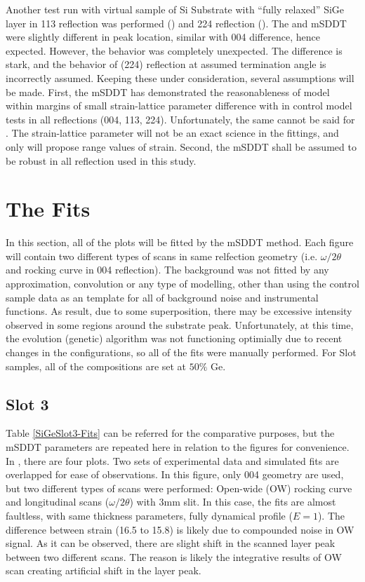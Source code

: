 Another test run with virtual sample of Si Substrate with ``fully relaxed'' SiGe layer in 113 reflection was performed () and 224 reflection ().
The \RADS  and mSDDT were slightly different in peak location, similar with 004 difference, hence expected.  However, the \LEPTOS behavior was completely unexpected.  The difference is stark, and the behavior of (224) reflection at assumed termination angle is incorrectly assumed.  Keeping these under consideration, several assumptions will be made.  First, the mSDDT has demonstrated the reasonableness of model within margins of small strain-lattice parameter difference with \RADS in control model tests in all reflections (004, 113, 224).  Unfortunately, the same cannot be said for \LEPTOS.  The strain-lattice parameter will not be an exact science in the fittings, and only will propose range values of  strain.  Second, the mSDDT shall be assumed to be robust in all reflection used in this study.

\section{The Fits}

In this section, all of the plots will be fitted by the mSDDT method.  Each figure will contain two different types of scans in same relfection geometry (i.e. $\omega/2\theta$ and rocking curve in 004 reflection).  The background was not fitted by any approximation, convolution or any type of modelling, other than using the control sample data as an template for all of background noise and instrumental functions.  As result, due to some superposition, there may be excessive intensity observed in some regions around the substrate peak.  Unfortunately, at this time, the evolution (genetic) algorithm was not functioning optimially due to recent changes in the \MathLogo configurations, so all of the fits were manually performed.  For Slot samples, all of the compositions are set at $50\%$ Ge.

\subsection{Slot 3}

Table \ref{SiGeSlot3-Fits} can be referred for the comparative purposes, but the mSDDT parameters are repeated here in relation to the figures for convenience.  In , there are four plots.  Two sets of experimental data and simulated fits are overlapped for ease of observations.  In this figure, only 004 geometry are used, but two different types of scans were performed:  Open-wide (OW) rocking curve and longitudinal scans ($\omega/2\theta$) with 3mm slit.  In this case, the fits are almost faultless, with same thickness parameters, fully dynamical profile ($E = 1$).  The difference between strain (16.5 to 15.8)  is likely due to compounded noise in OW signal.  As it can be observed, there are slight shift in the scanned layer peak between two different scans.  The reason is likely the integrative results of OW scan creating artificial shift in the layer peak.

